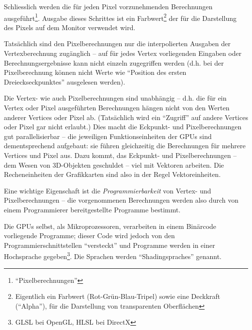 \documentclass[twoside,a4paper,fleqn,12pt]{book}
\begin{document}
Schliesslich werden die für jeden Pixel vorzunehmenden Berechnungen ausgeführt\footnote{"`\gls{Pixelberechnungen}"'}.
Ausgabe dieses Schrittes ist ein Farbwert\footnote{Eigentlich ein Farbwert (Rot-Grün-Blau-Tripel) sowie eine Deckkraft ("`Alpha"'), für die Darstellung von transparenten Oberflächen}
der für die Darstellung des Pixels auf dem Monitor verwendet wird.

Tatsächlich sind den Pixelberechnungen nur die interpolierten Ausgaben der Vertexberechnung zugänglich -- auf für jedes Vertex vorliegenden
Eingaben oder Berechnungsergebnisse kann nicht einzeln zugegriffen werden (d.h. bei der Pixelberechnung können nicht Werte wie
"`Position des ersten Dreieckseckpunktes"' ausgelesen werden).

Die Vertex- wie auch Pixelberechnungen sind unabhängig -- d.h. die für ein Vertex oder Pixel ausgeführten Berechnungen hängen
nicht von den Werten anderer Vertices oder Pixel ab. (Tatsächlich wird ein "`Zugriff"' auf andere Vertices oder Pixel gar nicht erlaubt.)
Dies macht die Eckpunkt- und Pixelberechnungen gut parallelisierbar -- die jeweiligen Funktionseinheiten der GPUs sind dementsprechend aufgebaut:
sie führen gleichzeitig die Berechnungen für mehrere Vertices und Pixel aus.
Dazu kommt, das Eckpunkt- und Pixelberechnungen -- dem Wesen von 3D-Objekten geschuldet -- viel mit Vektoren arbeiten. Die Recheneinheiten
der Grafikkarten sind also in der Regel Vektoreinheiten.

Eine wichtige Eigenschaft ist die \emph{Programmierbarkeit} von Vertex- und Pixelberechnungen
-- die vorgenommenen Berechnungen werden also durch von einem Programmierer bereitgestellte
Programme bestimmt. 

Die GPUs selbst, als Mikroprozessoren, verarbeiten in einem Binärcode vorliegende Programme; dieser Code
wird jedoch von den Programmierschnittstellen "`versteckt"' und Programme werden in einer Hochsprache gegeben\footnote{GLSL bei OpenGL, HLSL bei DirectX}.
Die Sprachen werden "`\glspl{Shadingsprache}"' genannt.
\end{document}
